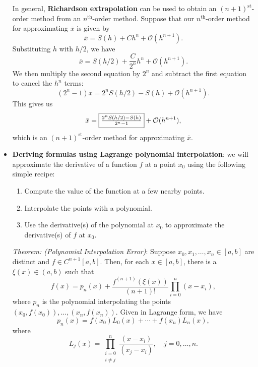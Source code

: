 \documentclass{report}
\begin{document}
\begin{itemize}
            In general, \textbf{Richardson extrapolation} can be used to obtain an $(n+1)^\text{st}$-order method from an $n^\text{th}$-order method.
            \bigbreak \noindent 
            Suppose that our $n^\text{th}$-order method for approximating $\bar{x}$ is given by
            $$
            \bar{x} = S(h) + Ch^n + \mathcal{O}(h^{n+1}).
            $$
            Substituting $h$ with $h/2$, we have
            $$
            \bar{x} = S(h/2) + \frac{C}{2^n}h^n + \mathcal{O}(h^{n+1}).
            $$
            We then multiply the second equation by $2^n$ and subtract the first equation to cancel the $h^n$ terms:
            $$
            (2^n - 1)\bar{x} = 2^n S(h/2) - S(h) + \mathcal{O}(h^{n+1}).
            $$
            This gives us
            $$
            \bar{x} = \fbox{$\frac{2^n S(h/2) - S(h)}{2^n - 1}$} + \mathcal{O}(h^{n+1}),
            $$
            which is an $(n+1)^\text{st}$-order method for approximating $\bar{x}$.
        \item \textbf{Deriving formulas using Lagrange polynomial interpolation}:
            we will approximate the derivative of a function $f$ at a point $x_0$ using the following simple recipe:
            \begin{enumerate}
                \item Compute the value of the function at a few nearby points.
                \item Interpolate the points with a polynomial.
                \item Use the derivative(s) of the polynomial at $x_0$ to approximate the derivative(s) of $f$ at $x_0$.
            \end{enumerate}
            \bigbreak \noindent 
            \begin{remark}
                \textit{Theorem: (Polynomial Interpolation Error)}: Suppose $x_0, x_1, \ldots, x_n \in [a,b]$ are distinct and $f \in C^{n+1}[a,b]$. Then, for each $x \in [a,b]$, there is a $\xi(x) \in (a,b)$ such that
                $$f(x) = p_n(x) + \frac{f^{(n+1)}(\xi(x))}{(n+1)!} \prod_{i=0}^n (x - x_i),$$
                where $p_n$ is the polynomial interpolating the points $(x_0,f(x_0)),\ldots,(x_n,f(x_n))$.
                \bigbreak \noindent 
                Given in Lagrange form, we have
                $$p_n(x) = f(x_0)L_0(x) + \cdots + f(x_n)L_n(x),$$
                where 
                $$L_j(x) = \prod_{\substack{i=0 \\ i \neq j}}^n \frac{(x - x_i)}{(x_j - x_i)}, \quad j = 0,\ldots,n.$$
            \end{remark}

\end{itemize}
\end{document}
